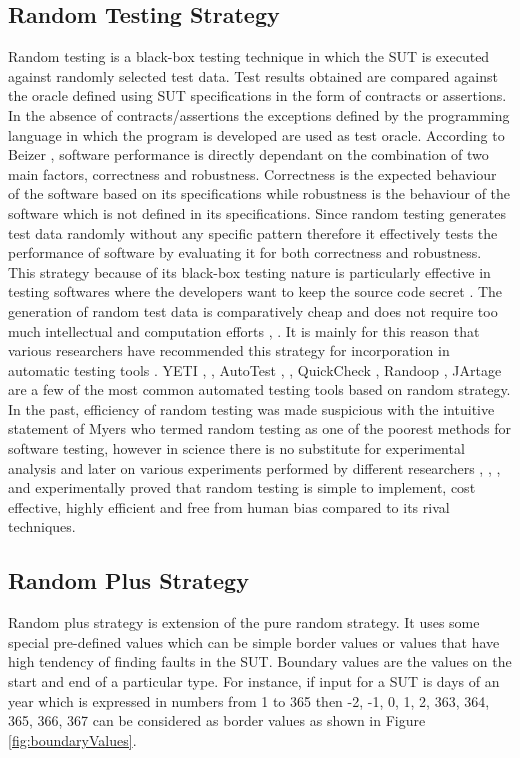 \documentclass[conference]{IEEEtran}
\begin{document}
\subsection{Random Testing Strategy}
Random testing is a black-box testing technique in which the SUT is executed against randomly selected test data. Test results obtained are compared against the oracle defined using SUT specifications in the form of contracts or assertions. In the absence of contracts/assertions the exceptions defined by the programming language in which the program is developed are used as test oracle. According to Beizer \cite{Beizer1990}, software performance is directly dependant on the combination of two main factors, correctness and robustness. Correctness is the expected behaviour of the software based on its specifications while robustness is the behaviour of the software which is not defined in its specifications. Since random testing generates test data randomly without any specific pattern therefore it effectively tests the performance of software by evaluating it for both correctness and robustness. This strategy because of its black-box testing nature is particularly effective in testing softwares where the developers want to keep the source code secret \cite{Chen2010}. The generation of random test data is comparatively cheap and does not require too much intellectual and computation efforts \cite{Ciupa2009}, \cite{Ciupa2008}. It is mainly for this reason that various researchers have recommended this strategy for incorporation in automatic testing tools \cite{Ciupa2008a}. YETI \cite{Oriol2010a}, \cite{Oriol2010}, AutoTest \cite{Leitner2007}, \cite{Ciupa2007}, QuickCheck \cite{Claessen2000}, Randoop \cite{Pacheco2007}, JArtage \cite{Oriat2004} are a few of the most common automated testing tools based on random strategy.\\
\indent In the past, efficiency of random testing was made suspicious with the intuitive statement of Myers \cite{Myers2004} who termed random testing as one of the poorest methods for software testing, however in science there is no substitute for experimental analysis and later on various experiments performed by different researchers \cite{Ciupa2007}, \cite{Duran1981}, \cite{Duran1984}, \cite{Hamlet1994} and \cite{Ntafos2001}  experimentally proved that random testing is simple to implement, cost effective, highly efficient and free from human bias compared to its rival techniques. 

\subsection{Random Plus Strategy}
Random plus strategy \cite{Leitner2007} is extension of the pure random strategy. It uses some special pre-defined values which can be simple border values or values that have high tendency of finding faults in the SUT. Boundary values \cite{Beizer1990} are the values on the start and end of a particular type. For instance,  if input for a SUT is days of an year which is expressed in numbers from 1 to 365 then -2, -1, 0, 1, 2, 363, 364, 365, 366, 367 can be considered as border values as shown in Figure \ref{fig:boundaryValues}. 
\end{document}

